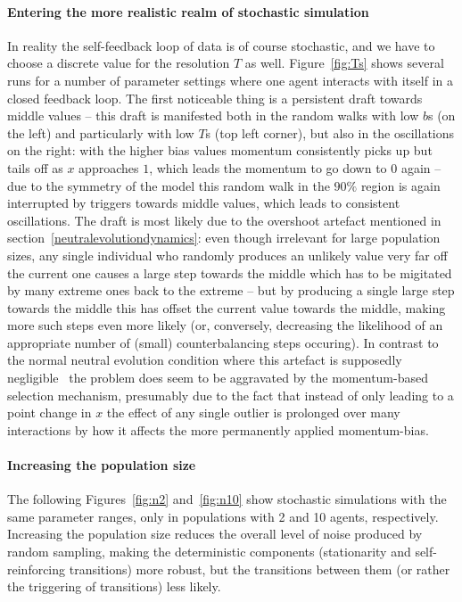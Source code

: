 \paragraph{Entering the more realistic realm of stochastic simulation}

In reality the self-feedback loop of data is of course stochastic, and we have to choose a discrete value for the resolution $T$ as well. Figure~\ref{fig:Ts} shows several runs for a number of parameter settings where one agent interacts with itself in a closed feedback loop. The first noticeable thing is a persistent draft towards middle values -- this draft is manifested both in the random walks with low $b$s (on the left) and particularly with low $T$s (top left corner), but also in the oscillations on the right: with the higher bias values momentum consistently picks up but tails off as $x$ approaches $1$, which leads the momentum to go down to 0 again -- due to the symmetry of the model this random walk in the $90\%$ region is again interrupted by triggers towards middle values, which leads to consistent oscillations. The draft is most likely due to the overshoot artefact mentioned in section~\ref{neutralevolutiondynamics}: even though irrelevant for large population sizes, any single individual who randomly produces an unlikely value very far off the current one causes a large step towards the middle which has to be migitated by many extreme ones back to the extreme -- but by producing a single large step towards the middle this has offset the current value towards the middle, making more such steps even more likely (or, conversely, decreasing the likelihood of an appropriate number of (small) counterbalancing steps occuring). In contrast to the normal neutral evolution condition where this artefact is supposedly negligible~\cite[p.7]{Baxter2006} the problem does seem to be aggravated by the momentum-based selection mechanism, presumably due to the fact that instead of only leading to a point change in $x$ the effect of any single outlier is prolonged over many interactions by how it affects the more permanently applied momentum-bias. %

\paragraph{Increasing the population size}

The following Figures~\ref{fig:n2} and~\ref{fig:n10} show stochastic simulations with the same parameter ranges, only in populations with 2 and 10 agents, respectively. Increasing the population size reduces the overall level of noise produced by random sampling, making the deterministic components (stationarity and self-reinforcing transitions) more robust, but the transitions between them (or rather the triggering of transitions) less likely.

